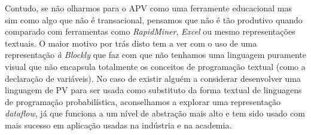 \documentclass[9pt,a4paper]{extarticle}
\begin{document}
\begin{multicols}{2}
Contudo, se não olharmos para o APV como uma ferramente educacional mas sim como
algo que não é transacional, pensamos que não é tão produtivo quando comparado com
ferramentas como \textit{RapidMiner}, \textit{Excel} ou mesmo representações textuais.
O maior motivo por trás disto tem a ver com o uso de uma representação \textit{à Blockly}
que faz com que não tenhamos uma linguagem puramente visual que não encapsula
totalmente os conceitos de programação textual (como a declaração de variáveis).
No caso de existir alguém a considerar desenvolver uma linguagem de PV para ser usada
como substituto da forma textual de linguagens de programação probabilística,
aconselhamos a explorar uma representação \textit{dataflow}, já que funciona a um
nível de abstração mais alto e tem sido usado com mais sucesso em aplicação usadas
na indústria e na academia.



\end{multicols}
\end{document}
